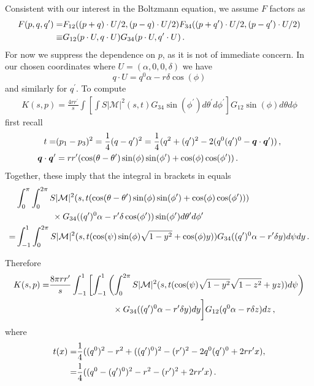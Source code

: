 Consistent with our interest in the Boltzmann equation, we assume $F$ factors as
\begin{align}
 F(p,q,q^{\prime})=&F_{12}((p+q)\cdot U/2,(p-q)\cdot U/2)F_{34}((p+q^{\prime})\cdot U/2,(p-q^{\prime})\cdot U/2)\\
\equiv &G_{12}(p\cdot U,q\cdot U)G_{34}(p\cdot U,q^{\prime}\cdot U)\,.\notag
\end{align}
For now we suppress the dependence on $p$, as it is not of immediate concern. In our chosen coordinates where $U=(\alpha,0,0,\delta)$ we have
\begin{equation}
q\cdot U=q^0\alpha-r\delta\cos(\phi)
\end{equation}
and similarly for $q^{\prime}$.
To compute
\begin{align}\label{K_angular1}
K(s,p)=\frac{4rr^{\prime}}{s}\int \left[\int S |\mathcal{M}|^2 (s,t) G_{34}\sin(\phi^{\prime})d\theta^{\prime} d\phi^{\prime}\right] G_{12}\sin(\phi)d\theta d\phi
\end{align}
first recall 
\begin{align}
t=&(p_1-p_3)^2=\frac{1}{4}(q- q^{\prime})^2=\frac{1}{4}(q^2+(q^{\prime})^2-2(q^0(q^{\prime})^0-\vec{q}\cdot \vec{q}^{\prime}))\,,\\
\vec{q}\cdot\vec{q}^{\prime}&=rr^{\prime}(\cos(\theta-\theta^{\prime})\sin(\phi)\sin(\phi^{\prime})+\cos(\phi)\cos(\phi^{\prime}))\,.\notag
\end{align}
Together, these imply that the integral in brackets in   equals
\begin{align}
&\int_0^\pi\int_0^{2\pi} S |\mathcal{M}|^2 (s,t(\cos(\theta-\theta^{\prime})\sin(\phi)\sin(\phi^{\prime})+\cos(\phi)\cos(\phi^{\prime})))\\
&\hspace{15mm}\times G_{34}((q^{\prime})^0\alpha-r^{\prime}\delta\cos(\phi^{\prime}))\sin(\phi^{\prime})d\theta^{\prime} d\phi^{\prime}\notag\\
=&\int_{-1}^1\int_0^{2\pi} S |\mathcal{M}|^2 (s,t(\cos(\psi)\sin(\phi)\sqrt{1-y^2}+\cos(\phi)y)) G_{34}((q^{\prime})^0\alpha-r^{\prime}\delta y)d\psi dy\,.\notag
\end{align}


Therefore 
\begin{align}
K(s,p)=&\frac{8\pi rr^{\prime}}{s}\int_{-1}^1 \left[\int_{-1}^1\left(\int_0^{2\pi} S |\mathcal{M}|^2 (s,t(\cos(\psi)\sqrt{1-y^2}\sqrt{1-z^2}+yz))d\psi\right)\right.\\
&\hspace{26mm}\times G_{34}((q^{\prime})^0\alpha-r^{\prime}\delta y) dy\bigg] G_{12}(q^0\alpha-r\delta z)dz\,,\notag
\end{align}
where
\begin{align}
t(x)=&\frac{1}{4}((q^0)^2-r^2+((q^{\prime})^0)^2-(r^{\prime})^2-2q^0(q^{\prime})^0+2rr^{\prime}x),\\
=&\frac{1}{4}((q^0-(q^{\prime})^0)^2-r^2-(r^{\prime})^2+2rr^{\prime}x)\,.\notag
\end{align}

